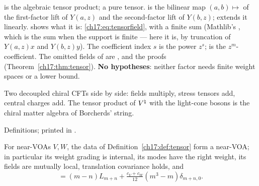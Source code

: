 \begin{dictionary}
 is the algebraic tensor product;  a pure tensor.   is the
bilinear map $(a,b)\mapsto$  of the first-factor lift of $Y(a,z)$ and the second-factor lift of
$Y(b,z)$;  extends it linearly.   shows what it is:
\eqref{ch17:eq:tensorfield}, with  a finite sum (Mathlib's , which is the sum when the
support is finite --- here it is, by truncation of $Y(a,z)x$ and $Y(b,z)y$).  The coefficient index $s$ is the
power $z^s$;  is the $z^m$-coefficient.  The omitted fields of  are
, 
and the proofs (Theorem~\ref{ch17:thm:tensor}).  \textbf{No hypotheses}: neither factor needs finite weight spaces or
a lower bound.
\end{dictionary}

\begin{physics}
Two decoupled chiral CFTs side by side: fields multiply, stress tensors add, central charges add.  The tensor
product of ${V^{\natural}}$ with the light-cone bosons is the chiral matter algebra of Borcherds' string.
\end{physics}

\begin{status}
Definitions; printed in .
\end{status}

\begin{theorem}\label{ch17:thm:tensor}
For near-VOAs $V,W$, the data of Definition~\ref{ch17:def:tensor} form a near-VOA; in particular its weight grading is
internal, its modes have the right weight, its fields are mutually local, translation covariance holds, and
\begin{equation*}
  [L_m,L_n]=(m-n)L_{m+n}+\tfrac{c_V+c_W}{12}(m^3-m)\delta_{m+n,0}.
\end{equation*}
\end{theorem}

